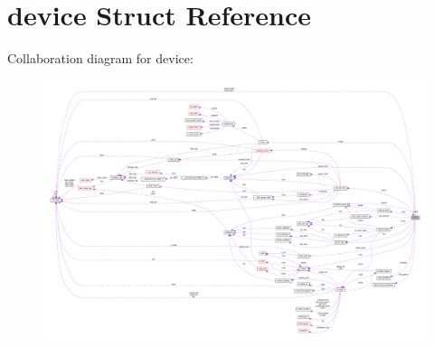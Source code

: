 \hypertarget{structdevice}{}\section{device Struct Reference}
\label{structdevice}


Collaboration diagram for device\+:
\nopagebreak
\begin{figure}[H]
\begin{center}
\leavevmode
\includegraphics[width=350pt]{structdevice__coll__graph}
\end{center}
\end{figure}
